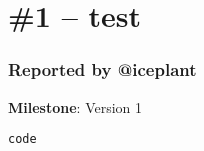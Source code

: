 \documentclass{article}
\begin{document}

{\section*{\#1 – test}}

{\subsubsection*{Reported by @iceplant}}
\textbf{Milestone}: Version 1\\

\begin{lstlisting}[backgroundcolor = \color{gray!10}]
code

\end{lstlisting}
\end{document}
